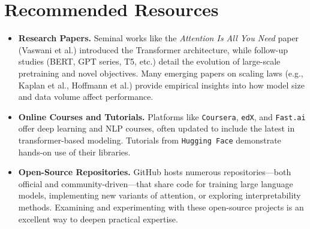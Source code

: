 \section{Recommended Resources}
\label{sec:recommended_resources}
\begin{itemize}
    \item \textbf{Research Papers.} Seminal works like the \emph{Attention Is All You Need} paper (Vaswani et al.) introduced the Transformer architecture, while follow-up studies (BERT, GPT series, T5, etc.) detail the evolution of large-scale pretraining and novel objectives. Many emerging papers on scaling laws (e.g., Kaplan et al., Hoffmann et al.) provide empirical insights into how model size and data volume affect performance.
    \item \textbf{Online Courses and Tutorials.} Platforms like \texttt{Coursera}, \texttt{edX}, and \texttt{Fast.ai} offer deep learning and NLP courses, often updated to include the latest in transformer-based modeling. Tutorials from \texttt{Hugging Face} demonstrate hands-on use of their libraries.
    \item \textbf{Open-Source Repositories.} GitHub hosts numerous repositories—both official and community-driven—that share code for training large language models, implementing new variants of attention, or exploring interpretability methods. Examining and experimenting with these open-source projects is an excellent way to deepen practical expertise.
\end{itemize}

